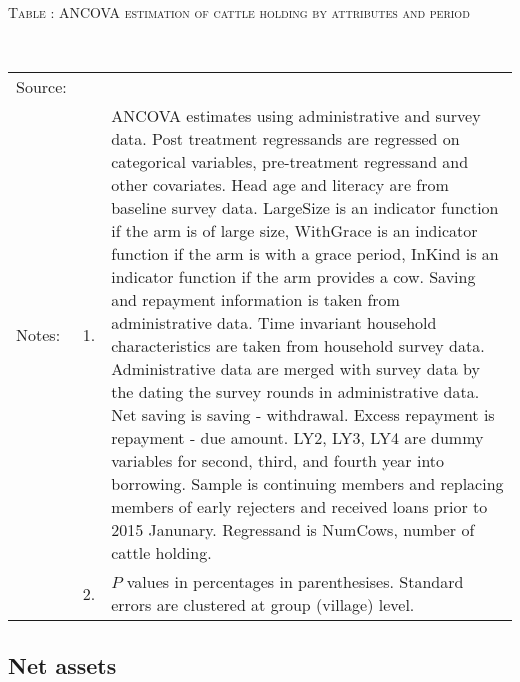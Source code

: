 \hspace{-1cm}\begin{minipage}[t]{14cm}
\hfil\textsc{\normalsize Table \thetable: ANCOVA estimation of cattle holding by attributes and period\label{tab ANCOVA cow time varying attributes}}\\
\setlength{\tabcolsep}{1pt}
\setlength{\baselineskip}{8pt}
\renewcommand{\arraystretch}{.55}
\hfil{}\\
\renewcommand{\arraystretch}{.8}
\setlength{\tabcolsep}{1pt}
\begin{tabular}{>{\hfill\scriptsize}p{1cm}<{}>{\hfill\scriptsize}p{.25cm}<{}>{\scriptsize}p{12cm}<{\hfill}}
Source:& \multicolumn{2}{l}{\scriptsize Estimated with GUK administrative and survey data.}\\
Notes: & 1. & ANCOVA estimates using administrative and survey data. Post treatment regressands are regressed on categorical variables, pre-treatment regressand and other covariates. Head age and literacy are from baseline survey data.  \textsf{LargeSize} is an indicator function if the arm is of large size, \textsf{WithGrace} is an indicator function if the arm is with a grace period, \textsf{InKind} is an indicator function if the arm provides a cow. Saving and repayment information is taken from administrative data. Time invariant household characteristics are taken from household survey data. Administrative data are merged with survey data by the dating the survey rounds in administrative data. Net saving is saving - withdrawal. Excess repayment is repayment - due amount. \textsf{LY2, LY3, LY4} are dummy variables for second, third, and 	fourth year into borrowing. Sample is continuing members and replacing members of early rejecters and received loans prior to 2015 Janunary. Regressand is \textsf{NumCows}, number of cattle holding. \\
& 2. & $P$ values in percentages in parenthesises. Standard errors are clustered at group (village) level.
\end{tabular}
\end{minipage}

\subsection{Net assets}


